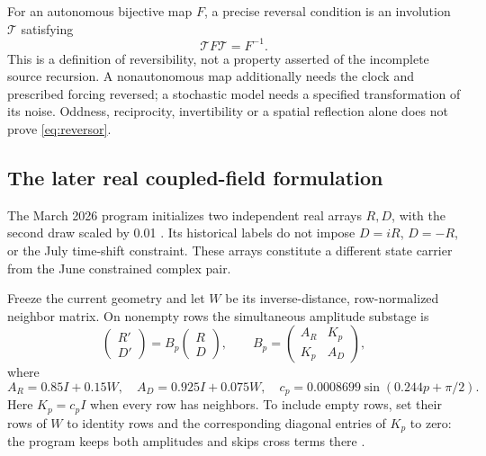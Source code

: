 \documentclass[11pt,a4paper]{article}
\theoremstyle{definition}
\numberwithin{equation}{section}
\begin{document}
For an autonomous bijective map $F$, a precise reversal condition is an
involution $\mathcal T$ satisfying
\begin{equation}
 \mathcal T F\mathcal T=F^{-1}.
 \label{eq:reversor}
\end{equation}
This is a definition of reversibility, not a property asserted of the
incomplete source recursion. A nonautonomous map additionally needs the
clock and prescribed forcing reversed; a stochastic model needs a
specified transformation of its noise. Oddness, reciprocity, invertibility
or a spatial reflection alone does not prove \eqref{eq:reversor}.

\subsection{The later real coupled-field formulation}
\label{sec:rd}

The March 2026 program initializes two independent real arrays $R,D$,
with the second draw scaled by 0.01
\cite[lines 70--91]{Infinity}. Its historical labels do not impose
$D=iR$, $D=-R$, or the July time-shift constraint.
These arrays constitute a different state carrier from the June constrained
complex pair.

Freeze the current geometry and let $W$ be its inverse-distance,
row-normalized neighbor matrix. On nonempty rows the simultaneous amplitude
substage is
\begin{equation}
 \begin{pmatrix}R'\\D'\end{pmatrix}
 =B_p\begin{pmatrix}R\\D\end{pmatrix},\qquad
 B_p=
 \begin{pmatrix}
  A_R&K_p\\K_p&A_D
 \end{pmatrix},
 \label{eq:rd-block}
\end{equation}
where
\begin{equation}
 A_R=0.85I+0.15W,\quad A_D=0.925I+0.075W,\quad
 c_p=0.0008699\sin(0.244p+\pi/2).
 \label{eq:rd-parameters}
\end{equation}
Here $K_p=c_pI$ when every row has neighbors. To include empty rows,
set their rows of $W$ to identity rows and the corresponding diagonal
entries of $K_p$ to zero: the program keeps both amplitudes and skips
cross terms there \cite[lines 114--135]{Infinity}.
\end{document}
